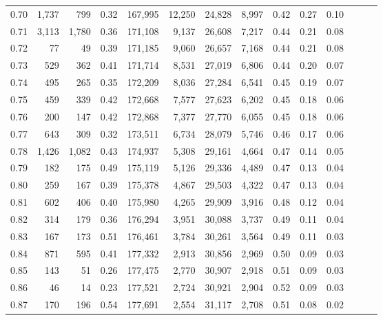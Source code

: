 \begin{tabular}{rrrrrrrrrrrrrr}
0.70 &   1,737 &    799 &  0.32 &  167,995 &   12,250 &  24,828 &   8,997 &  0.42 &  0.27 &      0.10 \\
0.71 &   3,113 &  1,780 &  0.36 &  171,108 &    9,137 &  26,608 &   7,217 &  0.44 &  0.21 &      0.08 \\
0.72 &      77 &     49 &  0.39 &  171,185 &    9,060 &  26,657 &   7,168 &  0.44 &  0.21 &      0.08 \\
0.73 &     529 &    362 &  0.41 &  171,714 &    8,531 &  27,019 &   6,806 &  0.44 &  0.20 &      0.07 \\
0.74 &     495 &    265 &  0.35 &  172,209 &    8,036 &  27,284 &   6,541 &  0.45 &  0.19 &      0.07 \\
0.75 &     459 &    339 &  0.42 &  172,668 &    7,577 &  27,623 &   6,202 &  0.45 &  0.18 &      0.06 \\
0.76 &     200 &    147 &  0.42 &  172,868 &    7,377 &  27,770 &   6,055 &  0.45 &  0.18 &      0.06 \\
0.77 &     643 &    309 &  0.32 &  173,511 &    6,734 &  28,079 &   5,746 &  0.46 &  0.17 &      0.06 \\
0.78 &   1,426 &  1,082 &  0.43 &  174,937 &    5,308 &  29,161 &   4,664 &  0.47 &  0.14 &      0.05 \\
0.79 &     182 &    175 &  0.49 &  175,119 &    5,126 &  29,336 &   4,489 &  0.47 &  0.13 &      0.04 \\
0.80 &     259 &    167 &  0.39 &  175,378 &    4,867 &  29,503 &   4,322 &  0.47 &  0.13 &      0.04 \\
0.81 &     602 &    406 &  0.40 &  175,980 &    4,265 &  29,909 &   3,916 &  0.48 &  0.12 &      0.04 \\
0.82 &     314 &    179 &  0.36 &  176,294 &    3,951 &  30,088 &   3,737 &  0.49 &  0.11 &      0.04 \\
0.83 &     167 &    173 &  0.51 &  176,461 &    3,784 &  30,261 &   3,564 &  0.49 &  0.11 &      0.03 \\
0.84 &     871 &    595 &  0.41 &  177,332 &    2,913 &  30,856 &   2,969 &  0.50 &  0.09 &      0.03 \\
0.85 &     143 &     51 &  0.26 &  177,475 &    2,770 &  30,907 &   2,918 &  0.51 &  0.09 &      0.03 \\
0.86 &      46 &     14 &  0.23 &  177,521 &    2,724 &  30,921 &   2,904 &  0.52 &  0.09 &      0.03 \\
0.87 &     170 &    196 &  0.54 &  177,691 &    2,554 &  31,117 &   2,708 &  0.51 &  0.08 &      0.02 \\

\end{tabular}
